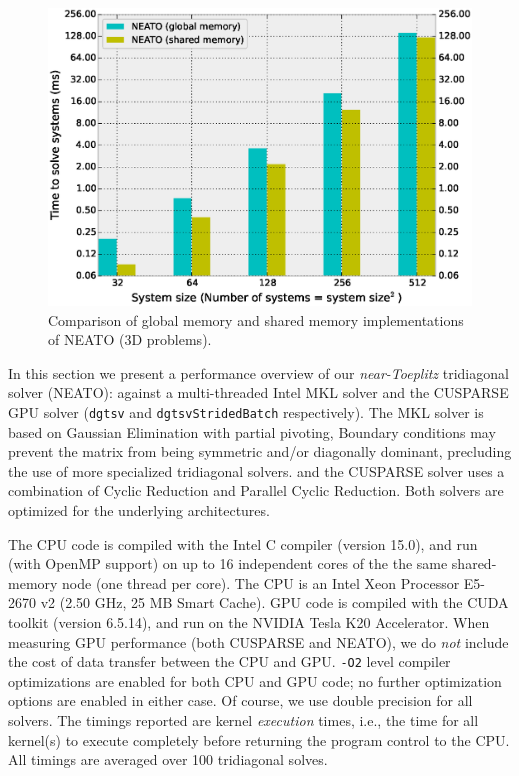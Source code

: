 \documentclass{elsarticle}
\begin{document}
\begin{figure}
\begin{center}
\includegraphics[width=1.0\linewidth]{fig/global-vs-shared-3d.eps}
\caption{Comparison of global memory and shared memory
    implementations of NEATO (3D problems).}
\label{fig:global-vs-shared-3d}
\end{center}
\end{figure}

In this section we present a performance overview
of our \emph{near-Toeplitz} tridiagonal solver (NEATO):
against a multi-threaded Intel MKL solver and
the CUSPARSE GPU solver
(\texttt{dgtsv} and \texttt{dgtsvStridedBatch} respectively).
The MKL solver is based on Gaussian Elimination with partial pivoting,
Boundary conditions may prevent
the matrix from being symmetric and/or diagonally dominant,
precluding the use of more specialized tridiagonal solvers.
and the CUSPARSE solver uses a combination of
Cyclic Reduction and Parallel Cyclic Reduction.
Both solvers are optimized for the underlying architectures.

The CPU code is compiled with the Intel C compiler (version 15.0),
and run (with OpenMP support) on up to
16 independent cores of the the same shared-memory node
(one thread per core).
The CPU is an
Intel Xeon Processor E5-2670 v2 (2.50 GHz, 25 MB Smart Cache).
GPU code is compiled with the CUDA toolkit (version 6.5.14),
and run on the
NVIDIA Tesla K20 Accelerator.
When measuring GPU performance (both CUSPARSE and NEATO),
we do \emph{not} include the cost
of data transfer between the CPU and GPU.
\texttt{-O2} level compiler optimizations are enabled for both
CPU and GPU code;
no further optimization options are enabled in either case.
Of course, we use double precision for all solvers.
The timings reported are
kernel \emph{execution} times, i.e.,
the time for all kernel(s) to execute completely
before returning the program control to the CPU.
All timings are averaged over 100 tridiagonal solves.
\end{document}
